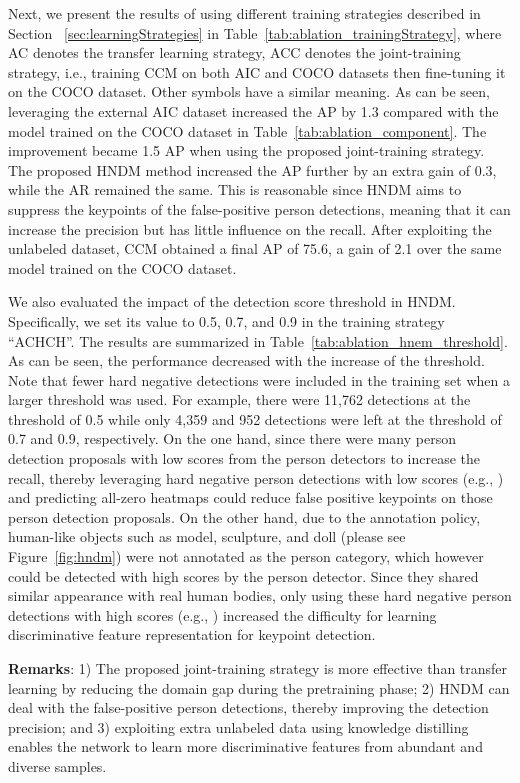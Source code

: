 \documentclass[twocolumn]{svjour3}          \smartqed  \usepackage{natbib}
\begin{document}
Next, we present the results of using different training strategies described in Section ~\ref{sec:learningStrategies} in Table~\ref{tab:ablation_trainingStrategy}, where AC denotes the transfer learning strategy, ACC denotes the joint-training strategy, i.e., training CCM on both AIC and COCO datasets then fine-tuning it on the COCO dataset. Other symbols have a similar meaning. As can be seen, leveraging the external AIC dataset increased the AP by 1.3 compared with the model trained on the COCO dataset in Table~\ref{tab:ablation_component}. The improvement became 1.5 AP when using the proposed joint-training strategy. The proposed HNDM method increased the AP further by an extra gain of 0.3, while the AR remained the same. This is reasonable since HNDM aims to suppress the keypoints of the false-positive person detections, meaning that it can increase the precision but has little influence on the recall. After exploiting the unlabeled dataset, CCM obtained a final AP of 75.6, a gain of 2.1 over the same model trained on the COCO dataset. 

We also evaluated the impact of the detection score threshold in HNDM. Specifically, we set its value to 0.5, 0.7, and 0.9 in the training strategy ``ACHCH''. The results are summarized in Table~\ref{tab:ablation_hnem_threshold}. As can be seen, the performance decreased with the increase of the threshold. Note that fewer hard negative detections were included in the training set when a larger threshold was used. For example, there were 11,762 detections at the threshold of 0.5 while only 4,359 and 952 detections were left at the threshold of 0.7 and 0.9, respectively. On the one hand, since there were many person detection proposals with low scores from the person detectors to increase the recall, thereby leveraging hard negative person detections with low scores (e.g., ) and predicting all-zero heatmaps could reduce false positive keypoints on those person detection proposals. On the other hand, due to the annotation policy, human-like objects such as model, sculpture, and doll (please see Figure~\ref{fig:hndm}) were not annotated as the person category, which however could be detected with high scores by the person detector. Since they shared similar appearance with real human bodies, only using these hard negative person detections with high scores (e.g., ) increased the difficulty for learning discriminative feature representation for keypoint detection.

\textbf{Remarks}: 1) The proposed joint-training strategy is more effective than transfer learning by reducing the domain gap during the pretraining phase; 2) HNDM can deal with the false-positive person detections, thereby improving the detection precision; and 3) exploiting extra unlabeled data using knowledge distilling enables the network to learn more discriminative features from abundant and diverse samples. 
\end{document}

